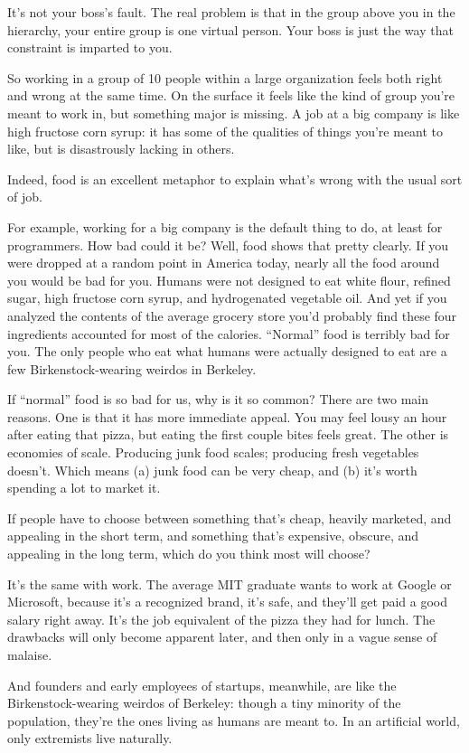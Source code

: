 It's not your boss's fault. The real problem is that in the group above
you in the hierarchy, your entire group is one virtual person. Your boss
is just the way that constraint is imparted to you.

So working in a group of 10 people within a large organization feels
both right and wrong at the same time. On the surface it feels like the
kind of group you're meant to work in, but something major is missing. A
job at a big company is like high fructose corn syrup: it has some of
the qualities of things you're meant to like, but is disastrously
lacking in others.

Indeed, food is an excellent metaphor to explain what's wrong with the
usual sort of job.

For example, working for a big company is the default thing to do, at
least for programmers. How bad could it be? Well, food shows that pretty
clearly. If you were dropped at a random point in America today, nearly
all the food around you would be bad for you. Humans were not designed
to eat white flour, refined sugar, high fructose corn syrup, and
hydrogenated vegetable oil. And yet if you analyzed the contents of the
average grocery store you'd probably find these four ingredients
accounted for most of the calories. ``Normal'' food is terribly bad for
you. The only people who eat what humans were actually designed to eat
are a few Birkenstock-wearing weirdos in Berkeley.

If ``normal'' food is so bad for us, why is it so common? There are two
main reasons. One is that it has more immediate appeal. You may feel
lousy an hour after eating that pizza, but eating the first couple bites
feels great. The other is economies of scale. Producing junk food
scales; producing fresh vegetables doesn't. Which means (a) junk food
can be very cheap, and (b) it's worth spending a lot to market it.

If people have to choose between something that's cheap, heavily
marketed, and appealing in the short term, and something that's
expensive, obscure, and appealing in the long term, which do you think
most will choose?

It's the same with work. The average MIT graduate wants to work at
Google or Microsoft, because it's a recognized brand, it's safe, and
they'll get paid a good salary right away. It's the job equivalent of
the pizza they had for lunch. The drawbacks will only become apparent
later, and then only in a vague sense of malaise.

And founders and early employees of startups, meanwhile, are like the
Birkenstock-wearing weirdos of Berkeley: though a tiny minority of the
population, they're the ones living as humans are meant to. In an
artificial world, only extremists live naturally.

